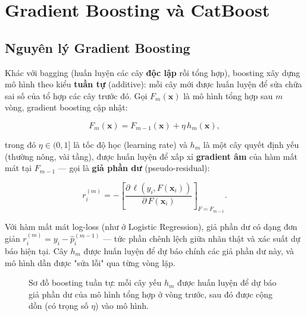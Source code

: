 \documentclass[a4paper]{article}
\begin{document}
\section{Gradient Boosting và CatBoost}
\label{sec:catboost}

\subsection{Nguyên lý Gradient Boosting}

Khác với bagging (huấn luyện các cây \textbf{độc lập} rồi tổng hợp), boosting
xây dựng mô hình theo kiểu \textbf{tuần tự} (additive): mỗi cây mới được huấn
luyện để sửa chữa sai số của tổ hợp các cây trước đó. Gọi $F_m(\mathbf{x})$ là
mô hình tổng hợp sau $m$ vòng, gradient boosting cập nhật:

\[
  F_m(\mathbf{x}) = F_{m-1}(\mathbf{x}) + \eta \, h_m(\mathbf{x}),
\]

trong đó $\eta \in (0, 1]$ là tốc độ học (learning rate) và $h_m$ là một cây
quyết định yếu (thường nông, vài tầng), được huấn luyện để xấp xỉ
\textbf{gradient âm} của hàm mất mát tại $F_{m-1}$ --- gọi là \textbf{giả
phần dư} (pseudo-residual):

\[
  r_i^{(m)} = -\left[ \frac{\partial \, \ell(y_i, F(\mathbf{x}_i))}
  {\partial \, F(\mathbf{x}_i)} \right]_{F = F_{m-1}}.
\]

Với hàm mất mát log-loss (như ở Logistic Regression), giả phần dư có dạng đơn
giản $r_i^{(m)} = y_i - \hat{p}_i^{(m-1)}$ --- tức phần chênh lệch giữa nhãn
thật và xác suất dự báo hiện tại. Cây $h_m$ được huấn luyện để dự báo chính
các giả phần dư này, và mô hình dần được "sửa lỗi" qua từng vòng lặp.

\begin{figure}[H]
  \centering
  \caption{Sơ đồ boosting tuần tự: mỗi cây yếu $h_m$ được huấn luyện để dự báo
  giả phần dư của mô hình tổng hợp ở vòng trước, sau đó được cộng dồn (có
  trọng số $\eta$) vào mô hình.}
  \label{fig:boosting}
\end{figure}
\end{document}
